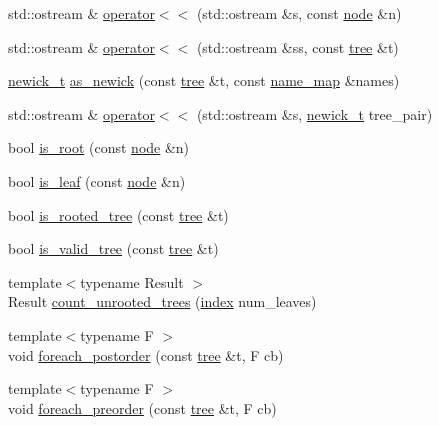 \begin{DoxyCompactItemize}
\item 
std\+::ostream \& \hyperlink{namespaceterraces_a734f29a465c2d80d4ee38d00ba2f7460}{operator$<$$<$} (std\+::ostream \&s, const \hyperlink{structterraces_1_1node}{node} \&n)
\item 
std\+::ostream \& \hyperlink{namespaceterraces_a9699b2c445ed0b3ca46836c7d0500817}{operator$<$$<$} (std\+::ostream \&ss, const \hyperlink{namespaceterraces_a07aaf7feec4a22c6cdefc14c5a81bdd0}{tree} \&t)
\item 
\hyperlink{structterraces_1_1newick__t}{newick\+\_\+t} \hyperlink{namespaceterraces_acad20ba1f31addcf2c533824cda625a3}{as\+\_\+newick} (const \hyperlink{namespaceterraces_a07aaf7feec4a22c6cdefc14c5a81bdd0}{tree} \&t, const \hyperlink{namespaceterraces_a4ef0217fe5aed881737d9bc5a8d45dca}{name\+\_\+map} \&names)
\item 
std\+::ostream \& \hyperlink{namespaceterraces_ad3526c917cfcc4424c9a1cac266e6f9f}{operator$<$$<$} (std\+::ostream \&s, \hyperlink{structterraces_1_1newick__t}{newick\+\_\+t} tree\+\_\+pair)
\item 
bool \hyperlink{namespaceterraces_a501de84c86e5d84c979cf4ec3151708e}{is\+\_\+root} (const \hyperlink{structterraces_1_1node}{node} \&n)
\item 
bool \hyperlink{namespaceterraces_a05257bc42db3c5cbed6ef082df709555}{is\+\_\+leaf} (const \hyperlink{structterraces_1_1node}{node} \&n)
\item 
bool \hyperlink{namespaceterraces_a4f378ba2800025b5b70a8647d70c751f}{is\+\_\+rooted\+\_\+tree} (const \hyperlink{namespaceterraces_a07aaf7feec4a22c6cdefc14c5a81bdd0}{tree} \&t)
\item 
bool \hyperlink{namespaceterraces_adec8cca335bd6030520d919ee9d6aa8b}{is\+\_\+valid\+\_\+tree} (const \hyperlink{namespaceterraces_a07aaf7feec4a22c6cdefc14c5a81bdd0}{tree} \&t)
\item 
{\footnotesize template$<$typename Result $>$ }\\Result \hyperlink{namespaceterraces_a3e839fe10a095b681cf4e7ef3ef687b9}{count\+\_\+unrooted\+\_\+trees} (\hyperlink{namespaceterraces_adbc33ccb543d1634e96d0eb02e472c77}{index} num\+\_\+leaves)
\item 
{\footnotesize template$<$typename F $>$ }\\void \hyperlink{namespaceterraces_a479ffe90c01af88c1683e743d417fe1a}{foreach\+\_\+postorder} (const \hyperlink{namespaceterraces_a07aaf7feec4a22c6cdefc14c5a81bdd0}{tree} \&t, F cb)
\item 
{\footnotesize template$<$typename F $>$ }\\void \hyperlink{namespaceterraces_a38d599d41ed134678e30b9cf7b454759}{foreach\+\_\+preorder} (const \hyperlink{namespaceterraces_a07aaf7feec4a22c6cdefc14c5a81bdd0}{tree} \&t, F cb)

\end{DoxyCompactItemize}
